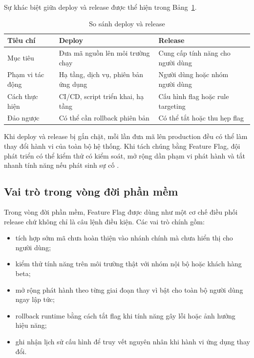 Sự khác biệt giữa deploy và release được thể hiện trong Bảng~\ref{tab:deploy-release-comparison}.

\begin{table}[H]
    \centering
    \caption{So sánh deploy và release}
    \label{tab:deploy-release-comparison}
    \begin{tabular}{p{} p{} p{}}
        \toprule
        \textbf{Tiêu chí} & \textbf{Deploy} & \textbf{Release} \\
        \midrule
        Mục tiêu & Đưa mã nguồn lên môi trường chạy & Cung cấp tính năng cho người dùng \\
        Phạm vi tác động & Hạ tầng, dịch vụ, phiên bản ứng dụng & Người dùng hoặc nhóm người dùng \\
        Cách thực hiện & CI/CD, script triển khai, hạ tầng & Cấu hình flag hoặc rule targeting \\
        Đảo ngược & Có thể cần rollback phiên bản & Có thể tắt hoặc thu hẹp flag \\
        \bottomrule
    \end{tabular}
\end{table}

Khi deploy và release bị gắn chặt, mỗi lần đưa mã lên production đều có thể làm thay đổi hành vi của toàn bộ hệ thống. Khi tách chúng bằng Feature Flag, đội phát triển có thể kiểm thử có kiểm soát, mở rộng dần phạm vi phát hành và tắt nhanh tính năng nếu phát sinh sự cố \cite{fowler_feature_toggles}.

\subsection{Vai trò trong vòng đời phần mềm}

Trong vòng đời phần mềm, Feature Flag được dùng như một cơ chế điều phối release chứ không chỉ là câu lệnh điều kiện. Các vai trò chính gồm:

\begin{itemize}
    \item tích hợp sớm mã chưa hoàn thiện vào nhánh chính mà chưa hiển thị cho người dùng;
    \item kiểm thử tính năng trên môi trường thật với nhóm nội bộ hoặc khách hàng beta;
    \item mở rộng phát hành theo từng giai đoạn thay vì bật cho toàn bộ người dùng ngay lập tức;
    \item rollback runtime bằng cách tắt flag khi tính năng gây lỗi hoặc ảnh hưởng hiệu năng;
    \item ghi nhận lịch sử cấu hình để truy vết nguyên nhân khi hành vi ứng dụng thay đổi.
\end{itemize}

